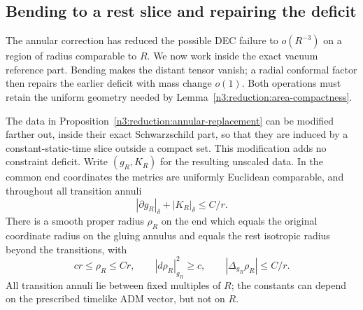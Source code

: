 \subsection{Bending to a rest slice and repairing the deficit}

The annular correction has reduced the possible DEC failure to
$o(R^{-3})$ on a region of radius comparable to $R$. We now work inside
the exact vacuum reference part. Bending makes the distant tensor vanish;
a radial conformal factor then repairs the earlier deficit with mass
change $o(1)$. Both operations must retain the uniform geometry needed by
Lemma~\ref{n3:reduction:area-compactness}.

\begin{lemma}
\label{n3:reduction:vacuum-bend}
The data in Proposition~\ref{n3:reduction:annular-replacement} can be
modified farther out, inside their exact Schwarzschild part, so that
they are induced by a constant-static-time slice outside a compact set.
This modification adds no constraint deficit.  Write $(g_R,K_R)$ for
the resulting unscaled data.  In the common end
coordinates the metrics are uniformly Euclidean comparable,
and throughout all transition annuli
\begin{equation}
 \label{n3:reduction:bend-geometry}
 |\partial g_R|_\delta+|K_R|_\delta\le C/r.
\end{equation}
There is a smooth proper radius $\rho_R$ on the end which equals the original
coordinate radius on the gluing annulus and equals the rest isotropic
radius beyond the transitions, with
\begin{equation}
 \label{n3:reduction:radius-geometry}
 c r\le\rho_R\le C r,\qquad
 |d\rho_R|_{g_R}^2\ge c,
 \qquad |\Delta_{g_R}\rho_R|\le C/r.
\end{equation}
All transition annuli lie between fixed multiples of $R$; the constants
can depend on the prescribed timelike ADM vector, but not on $R$.
\end{lemma}

